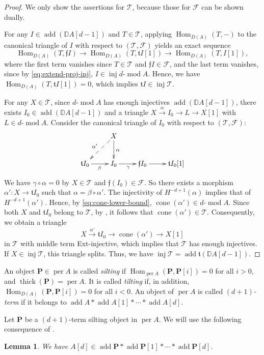 \documentclass[11pt,a4paper,reqno]{amsart}
\theoremstyle{plain}
\newtheorem{lemma}[theorem]{Lemma}
\numberwithin{equation}{section}
\theoremstyle{definition}
\providecommand{\add}{\operatorname{add}}
\providecommand{\per}{\operatorname{per}}
\providecommand{\thick}{\operatorname{thick}}
\renewcommand{\mod}{\operatorname{mod}}
\newcommand{\Hom}{\operatorname{Hom}}
\newcommand{\Inj}{\operatorname{inj}}
\newcommand{\emod}[2]{#1\text{-}\!\mod #2}
\newcommand{\PP}{\mathbf{P}}
\newcommand{\T}{\mathcal{T}}
\newcommand{\F}{\mathcal{F}}
\begin{document}
\begin{proof}
  We only show the assertions for $\T$, because those for $\F$ can be shown dually.

  For any $I\in\add\left(\mathbb D A[d-1]\right)$ and $T\in\T$, applying $\Hom_{D(A)}(T,-)$ to the canonical triangle of $I$ with respect to $(\T,\F)$ yields an exact sequence
  \[
  \Hom_{D(A)}(T,\mathfrak{f}I)\to\Hom_{D(A)}(T,\mathfrak{t}I[1])\to\Hom_{D(A)}(T,I[1]),
  \]
  where the first term vanishes since $T\in\T$ and $\mathfrak{f}I\in\F$, and the last term vanishes, since by \eqref{eq:extend-proj-inj}, $I\in\Inj\emod{d}{A}$. Hence, we have $\Hom_{D(A)}(T,\mathfrak{t}I[1])=0$, which implies $\mathfrak{t}I\in\Inj\T$.

  For any $X\in\T$, since $\emod{d}{A}$ has enough injectives $\add\left(\mathbb D A[d-1]\right)$, there exists $I_0\in \add\left(\mathbb D A[d-1]\right)$ and a triangle $X\xrightarrow{\alpha}I_0\to L\to X[1]$ with $L\in\emod{d}{A}$. Consider the canonical triangle of $I_0$ with respect to $(\T,\F)$:
  \[\xymatrix{
    &X\ar[d]^{\alpha}\ar@{-->}[ld]_{\alpha'}\\
    \mathfrak{t}I_0\ar[r]_{\beta} &I_0\ar[r]_{\gamma} & \mathfrak{f}I_0\ar[r]& \mathfrak{t}I_0[1]
  }\]
  We have $\gamma\circ\alpha=0$ by $X\in\T$ and $\mathfrak{f}(I_0)\in\F$. So there exists a morphism $\alpha'\colon X\to \mathfrak{t}I_0$ such that $\alpha=\beta\circ\alpha'$. The injectivity of $H^{-d+1}(\alpha)$ implies that of $H^{-d+1}(\alpha')$. Hence, by \eqref{eq:cone-lower-bound}, $\operatorname{cone}(\alpha')\in\emod{d}{A}$. Since both $X$ and $\mathfrak{t}I_0$ belong to $\T$, by \cite[Lemma~3.9]{GZ}, it follows that $\operatorname{cone}(\alpha')\in\T$. Consequently, we obtain a triangle
  \[
  X\xrightarrow{\alpha'}\mathfrak{t}I_0\to\operatorname{cone}(\alpha')\to X[1]
  \]
  in $\T$ with middle term Ext-injective, which implies that $\T$ has enough injectives. If $X\in\Inj\T$, this triangle splits. Thus, we have $\Inj\T=\add\mathfrak{t}(\mathbb D A[d-1])$. 
\end{proof}

An object $\PP\in\per A$ is called \emph{silting} if $\Hom_{\per A}(\PP,\PP[i])=0$ for all $i>0$, and $\thick(\PP)=\per A$. It is called \emph{tilting} if, in addition, $\Hom_{D(A)}(\PP,\PP[i])=0$ for all $i<0$. An object of $\per A$ is called \emph{$(d+1)$-term} if it belongs to $\add A*\add A[1]*\cdots*\add A[d]$.

Let $\PP$ be a $(d+1)$-term silting object in $\per A$. We will use the following consequence of \cite[Lemma~3.7]{AMY}.
\begin{lemma}\label{lem:AinP}
We have $A[d]\in\add\PP*\add\PP[1]*\cdots*\add\PP[d]$.
\end{lemma}
\end{document}
